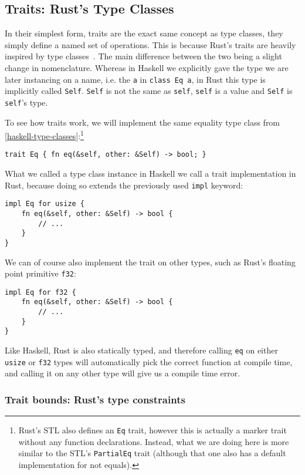 \subsection{Traits: Rust's Type Classes}

In their simplest form, traits are the exact same concept as type classes, they simply define a named set of operations. This is because Rust's traits are heavily inspired by type classes~\cite[Chapter~20.2]{rust-reference}. The main difference between the two being a slight change in nomenclature. Whereas in Haskell we explicitly gave the type we are later instancing on a name, i.e. the \verb|a| in \verb|class Eq a|, in Rust this type is implicitly called \verb|Self|. \verb|Self| is not the same as \verb|self|, \verb|self| is a value and \verb|Self| is \verb|self|'s type.

To see how traits work, we will implement the same equality type class from \autoref{haskell-type-classes}:\footnote{Rust's STL also defines an \verb|Eq| trait, however this is actually a marker trait without any function declarations. Instead, what we are doing here is more similar to the STL's \verb|PartialEq| trait (although that one also has a default implementation for not equals).}
\begin{verbatim}
trait Eq { fn eq(&self, other: &Self) -> bool; }
\end{verbatim}
What we called a type class instance in Haskell we call a trait implementation in Rust, because doing so extends the previously used \verb|impl| keyword:
\begin{verbatim}
impl Eq for usize {
    fn eq(&self, other: &Self) -> bool {
        // ...
    }
}
\end{verbatim}
We can of course also implement the trait on other types, such as Rust's floating point primitive \verb|f32|:
\begin{verbatim}
impl Eq for f32 {
    fn eq(&self, other: &Self) -> bool {
        // ...
    }
}
\end{verbatim}

Like Haskell, Rust is also statically typed, and therefore calling \verb|eq| on either \verb|usize| or \verb|f32| types will automatically pick the correct function at compile time, and calling it on any other type will give us a compile time error.

\subsubsection{Trait bounds: Rust's type constraints}

